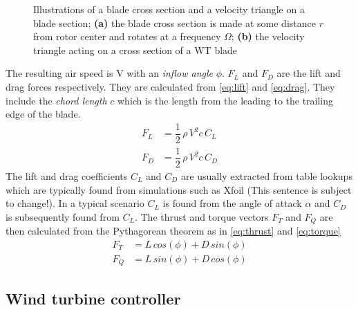 \begin{figure}[!t]
	\centering
	\hfil
	\caption{Illustrations of a blade cross section and a velocity triangle on a blade section; \textbf{(a)} the blade cross section is made at some distance $ r $ from rotor center and rotates at a frequency $ \Omega $; \textbf{(b)} the velocity triangle acting on a cross section of a WT blade}
	\label{fig:blade_triangles}
\end{figure}

The resulting air speed is V with an \textit{inflow angle} $ \phi $. $ F_L $ and $ F_D $ are the lift and drag forces respectively. They are calculated from \cref{eq:lift} and \cref{eq:drag}. They include the \textit{chord length} $ c $ which is the length from the leading to the trailing edge of the blade.
\begin{align}
	F_L &= \dfrac{1}{2}\,  \rho \, V^2 c \, C_L \label{eq:lift}\\
	F_D &= \dfrac{1}{2} \, \rho \, V^2 c \, C_D \label{eq:drag}
\end{align}
The lift and drag coefficients $ C_L $ and $ C_D $ are usually extracted from table lookups which are typically found from simulations such as Xfoil (This sentence is subject to change!). In a typical scenario $ C_L $ is found from the angle of attack $ \alpha $ and $ C_D $ is subsequently found from $ C_L $. The thrust and torque vectors $ F_T $ and $ F_Q $ are then calculated from the Pythagorean theorem as in \cref{eq:thrust} and \cref{eq:torque}
\begin{align}
	F_T &= L \, cos(\phi) + D \, sin(\phi) \label{eq:thrust} \\
	F_Q &= L \, sin(\phi) + D \, cos(\phi) \label{eq:torque}
\end{align}


\subsection{Wind turbine controller}